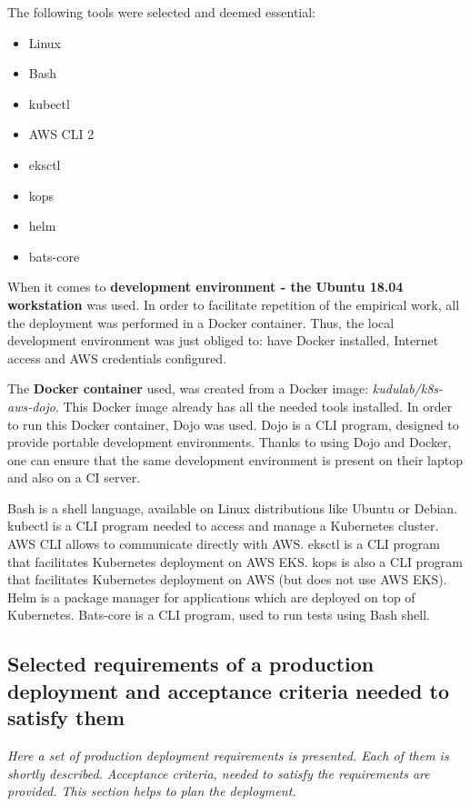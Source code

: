The following tools were selected and deemed essential:
\begin{itemize}
\item Linux
\item Bash
\item kubectl
\item AWS CLI 2
\item eksctl
\item kops
\item helm
\item bats-core
\end{itemize}

When it comes to \textbf{development environment - the Ubuntu 18.04 workstation} was used. In order to facilitate repetition of the empirical work, all the deployment was performed in a Docker container. Thus, the local development environment was just obliged to: have Docker installed, Internet access and AWS credentials configured.

The \textbf{Docker container} used, was created from a Docker image: \textit{kudulab/k8s-aws-dojo}\cite{gh-k8s-aws-dojo}. This Docker image already has all the needed tools installed. In order to run this Docker container, Dojo was used. Dojo is a CLI program, designed to provide portable development environments\cite{gh-dojo}. Thanks to using Dojo and Docker, one can ensure that the same development environment is present on their laptop and also on a CI server.

Bash is a shell language, available on Linux distributions like Ubuntu or Debian. kubectl is a CLI program needed to access and manage a Kubernetes cluster\cite{kubectl}. AWS CLI allows to communicate directly with AWS. eksctl is a CLI program that facilitates Kubernetes deployment on AWS EKS\cite{eksctl}. kops is also a CLI program that facilitates Kubernetes deployment on AWS (but does not use AWS EKS)\cite{online-kops}. Helm is a package manager for applications which are deployed on top of Kubernetes\cite{helm}. Bats-core is a CLI program, used to run tests using Bash shell\cite{bats-core}.

\subsection{Selected requirements of a production deployment and acceptance criteria needed to satisfy them}
\textit{Here a set of production deployment requirements is presented. Each of them is shortly described. Acceptance criteria, needed to satisfy the requirements are provided. This section helps to plan the deployment.}
\\

